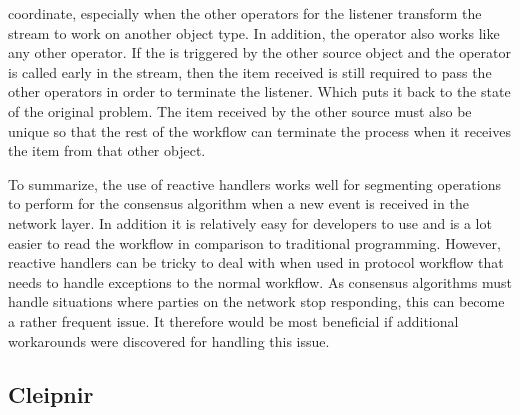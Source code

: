 coordinate, especially when the other operators for the listener transform the stream to work on another object type. In addition, the  operator also works like any other operator. If the  is triggered by the other source object and the operator is called early in the stream, then the item received is still required to pass the other operators in order to terminate the listener. Which puts it back to the state of the original problem. The item received by the other source must also be unique so that the rest of the workflow can terminate the process when it receives the item from that other  object.

To summarize, the use of reactive handlers works well for segmenting operations to perform for the consensus algorithm when a new event is received in the network layer. In addition it is relatively easy for developers to use and is a lot easier to read the workflow in comparison to traditional programming. However, reactive handlers can be tricky to deal with when used in protocol workflow that needs to handle exceptions to the normal workflow. As consensus algorithms must handle situations where parties on the network stop responding, this can become a rather frequent issue. It therefore would be most beneficial if additional workarounds were discovered for handling this issue.  

\subsection{Cleipnir}

